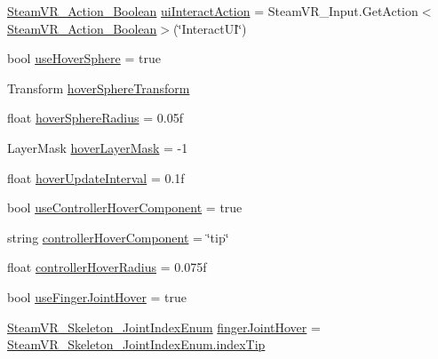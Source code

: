 \begin{DoxyCompactItemize}
\item 
\mbox{\hyperlink{class_valve_1_1_v_r_1_1_steam_v_r___action___boolean}{Steam\+V\+R\+\_\+\+Action\+\_\+\+Boolean}} \mbox{\hyperlink{class_valve_1_1_v_r_1_1_interaction_system_1_1_hand_afbfd52faf00100f0e2d919c1aa70369f}{ui\+Interact\+Action}} = Steam\+V\+R\+\_\+\+Input.\+Get\+Action$<$\mbox{\hyperlink{class_valve_1_1_v_r_1_1_steam_v_r___action___boolean}{Steam\+V\+R\+\_\+\+Action\+\_\+\+Boolean}}$>$(\char`\"{}Interact\+UI\char`\"{})
\item 
bool \mbox{\hyperlink{class_valve_1_1_v_r_1_1_interaction_system_1_1_hand_a4515c9535954c2d15861f1d77c03583e}{use\+Hover\+Sphere}} = true
\item 
Transform \mbox{\hyperlink{class_valve_1_1_v_r_1_1_interaction_system_1_1_hand_a5248cf59c17fc539634027c699b7126b}{hover\+Sphere\+Transform}}
\item 
float \mbox{\hyperlink{class_valve_1_1_v_r_1_1_interaction_system_1_1_hand_a96761a4bc7740a43c166c4f140e5d940}{hover\+Sphere\+Radius}} = 0.\+05f
\item 
Layer\+Mask \mbox{\hyperlink{class_valve_1_1_v_r_1_1_interaction_system_1_1_hand_aaf9a9febdfac710b0f6e3797ddeda6c2}{hover\+Layer\+Mask}} = -\/1
\item 
float \mbox{\hyperlink{class_valve_1_1_v_r_1_1_interaction_system_1_1_hand_ac6fb0d8b74fe8377590ef9be83c9406c}{hover\+Update\+Interval}} = 0.\+1f
\item 
bool \mbox{\hyperlink{class_valve_1_1_v_r_1_1_interaction_system_1_1_hand_a886a2752cf08cbf0097a3c63da335e2e}{use\+Controller\+Hover\+Component}} = true
\item 
string \mbox{\hyperlink{class_valve_1_1_v_r_1_1_interaction_system_1_1_hand_a841fd696c675a8c0c026c9189f3de30f}{controller\+Hover\+Component}} = \char`\"{}tip\char`\"{}
\item 
float \mbox{\hyperlink{class_valve_1_1_v_r_1_1_interaction_system_1_1_hand_a3d3ac74514ff744d838297b153aac9ff}{controller\+Hover\+Radius}} = 0.\+075f
\item 
bool \mbox{\hyperlink{class_valve_1_1_v_r_1_1_interaction_system_1_1_hand_aa39365be4208de10ee16491637bd0f56}{use\+Finger\+Joint\+Hover}} = true
\item 
\mbox{\hyperlink{namespace_valve_1_1_v_r_a99f7cc968994699a7485078bafddac17}{Steam\+V\+R\+\_\+\+Skeleton\+\_\+\+Joint\+Index\+Enum}} \mbox{\hyperlink{class_valve_1_1_v_r_1_1_interaction_system_1_1_hand_a535e15906cee89bccbfff5e472d6b0e8}{finger\+Joint\+Hover}} = \mbox{\hyperlink{namespace_valve_1_1_v_r_a99f7cc968994699a7485078bafddac17afff4b1bc9444941114a424298cd59033}{Steam\+V\+R\+\_\+\+Skeleton\+\_\+\+Joint\+Index\+Enum.\+index\+Tip}}

\end{DoxyCompactItemize}
